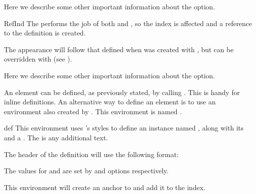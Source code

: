 \documentclass[11pt, outputdir = ./out]{article}
\begin{document}
\begin{example}{}
    Here we describe some other important information about the   option.
\end{example}

\begin{Macro*}{RefInd}{}{}
    The  performs the job of both  and , so the index is affected and a reference to the definition is created.

    The appearance will follow that defined when  was created with , but can be overridden with  (see ).
\end{Macro*}

\begin{example}{}
    Here we describe some other important information about the   option.
\end{example}

An element can be defined, as previously stated, by calling . This is handy for inline definitions. An alternative way to define an element is to use an environment also created by . This environment is named .

\begin{Environmentenv}{def}{}{}
    \label{environmentdef}
    This environment uses 's styles to define an instance named , along with its  and a . The  is any additional text.

    The header of the definition will use the following format:


    The values for  and  are set by  and  options respectively.

    This environment will create an anchor to  and add it to the index.
\end{Environmentenv}
\end{document}
